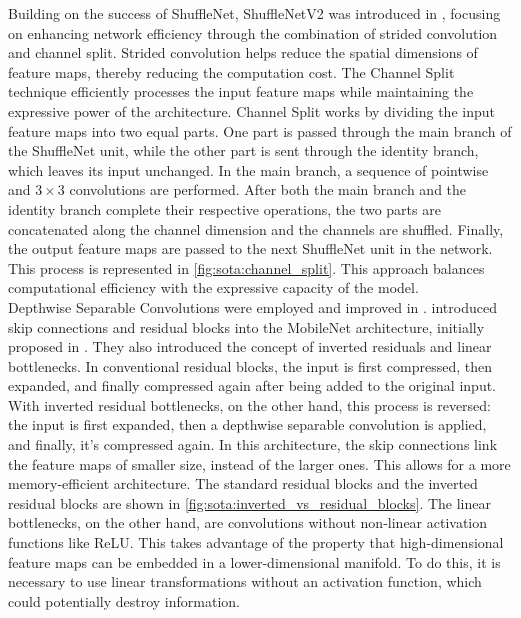Building on the success of ShuffleNet, ShuffleNetV2 was introduced in
\cite{MaShuffleNetV2}, focusing on enhancing network efficiency through the
combination of strided convolution and channel split. Strided convolution helps
reduce the spatial dimensions of feature maps, thereby reducing the computation
cost. The Channel Split technique efficiently processes the input feature maps
while maintaining the expressive power of the architecture. Channel Split works
by dividing the input feature maps into two equal parts. One part is passed
through the main branch of the ShuffleNet unit, while the other part is sent
through the identity branch, which leaves its input unchanged. In the main
branch, a sequence of pointwise and $3\times 3$ convolutions are performed.
After both the main branch and the identity branch complete their respective
operations, the two parts are concatenated along the channel dimension and the
channels are shuffled. Finally, the output feature maps are passed to the next
ShuffleNet unit in the network. This process is represented in
\cref{fig:sota:channel_split}. This approach balances computational efficiency
with the expressive capacity of the model.\\

Depthwise Separable Convolutions were employed and improved in
\cite{howard2017mobilenets}. \citeauthor{DongMobileNetV2} introduced skip
connections and residual blocks into the MobileNet architecture, initially
proposed in \cite{DBLP:conf/cvpr/HeZRS16}. They also introduced the concept of
inverted residuals and linear bottlenecks. In conventional residual blocks, the
input is first compressed, then expanded, and finally compressed again after
being added to the original input. With inverted residual bottlenecks, on the
other hand, this process is reversed: the input is first expanded, then a
depthwise separable convolution is applied, and finally, it's compressed again.
In this architecture, the skip connections link the feature maps of smaller
size, instead of the larger ones. This allows for a more memory-efficient
architecture. The standard residual blocks and the inverted residual blocks are
shown in \cref{fig:sota:inverted_vs_residual_blocks}. The linear bottlenecks, on
the other hand, are convolutions without non-linear activation functions like
\ac{ReLU}. This takes advantage of the property that high-dimensional feature
maps can be embedded in a lower-dimensional manifold. To do this, it is
necessary to use linear transformations without an activation function, which
could potentially destroy information.\\

